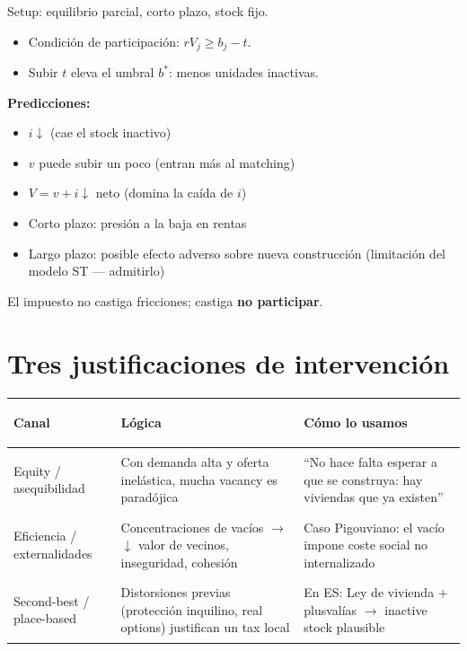 \documentclass[11pt,a4paper]{report}
\begin{document}
\begin{modelo}
Setup: equilibrio parcial, corto plazo, stock fijo.
\begin{itemize}
  \item Condici\'on de participaci\'on: $rV_j \ge b_j - t$.
  \item Subir $t$ eleva el umbral $b^{*}$: menos unidades inactivas.
\end{itemize}
\textbf{Predicciones:}
\begin{itemize}
  \item $i \downarrow$ (cae el stock inactivo)
  \item $v$ puede subir un poco (entran m\'as al matching)
  \item $V = v+i \downarrow$ neto (domina la ca\'ida de $i$)
  \item Corto plazo: presi\'on a la baja en rentas
  \item Largo plazo: posible efecto adverso sobre nueva construcci\'on
        (limitaci\'on del modelo ST --- admitirlo)
\end{itemize}
\end{modelo}

\begin{frase}
El impuesto no castiga fricciones; castiga \textbf{no participar}.
\end{frase}

\section{Tres justificaciones de intervenci\'on}

\begin{center}
\renewcommand{\arraystretch}{1.25}
\begin{tabularx}{\textwidth}{@{}>{\bfseries\raggedright\arraybackslash}p{2.6cm}
  >{\raggedright\arraybackslash}X
  >{\raggedright\arraybackslash}X@{}}
\toprule
Canal & L\'ogica & C\'omo lo usamos \\
\midrule
Equity / asequibilidad &
Con demanda alta y oferta inel\'astica, mucha vacancy es parad\'ojica &
``No hace falta esperar a que se construya: hay viviendas que ya existen'' \\
Eficiencia / externalidades &
Concentraciones de vac\'ios $\rightarrow$ $\downarrow$ valor de vecinos, inseguridad, cohesi\'on &
Caso Pigouviano: el vac\'io impone coste social no internalizado \\
Second-best / place-based &
Distorsiones previas (protecci\'on inquilino, real options) justifican un tax local &
En ES: Ley de vivienda + plusval\'ias $\rightarrow$ inactive stock plausible \\
\bottomrule
\end{tabularx}
\end{center}
\end{document}
